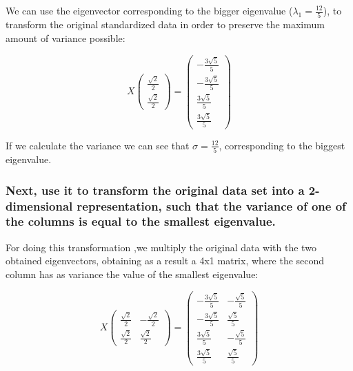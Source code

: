 \documentclass[12pt]{article}
\begin{document}
We can use the eigenvector corresponding to the bigger eigenvalue ($\lambda_1=\frac{12}{5}$), to transform the original standardized data in order to preserve the maximum amount of variance possible:

\begin{equation}
    X \begin{pmatrix} \frac{\sqrt{2}}{2} \\ \frac{\sqrt{2}}{2}\end{pmatrix} = 
    \begin{pmatrix}
        -\frac{3\sqrt{5}}{5} \\
        -\frac{3\sqrt{5}}{5} \\
        \frac{3\sqrt{5}}{5} \\
        \frac{3\sqrt{5}}{5}
    \end{pmatrix}
\end{equation}

If we calculate the variance we can see that $\sigma=\frac{12}{5}$, corresponding to the biggest eigenvalue.

\subsubsection{Next, use it to transform the original data set into a 2-dimensional representation, such that the variance of one of the columns is equal to the smallest eigenvalue.}

For doing this transformation ,we multiply the original data with the two obtained eigenvectors, obtaining as a result a 4x1 matrix, where the second column has as variance the value of the smallest eigenvalue:

\begin{equation}
    X 
    \begin{pmatrix} 
        \frac{\sqrt{2}}{2} & -\frac{\sqrt{2}}{2} \\ 
        \frac{\sqrt{2}}{2} & \frac{\sqrt{2}}{2}
    \end{pmatrix} 
    = 
    \begin{pmatrix}
        -\frac{3\sqrt{5}}{5} & -\frac{\sqrt{5}}{5} \\
        -\frac{3\sqrt{5}}{5} & \frac{\sqrt{5}}{5}  \\
        \frac{3\sqrt{5}}{5}  & -\frac{\sqrt{5}}{5} \\
        \frac{3\sqrt{5}}{5}  & \frac{\sqrt{5}}{5}
    \end{pmatrix}
\end{equation}
\end{document}
